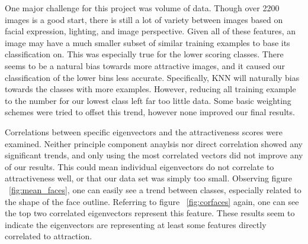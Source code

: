 \documentclass[10pt,twocolumn,letterpaper]{article}
\begin{document}
One major challenge for this project was volume of data. Though over 2200 images is a good start, there is still a lot of variety between images based on facial expression, lighting, and image perspective. Given all of these features, an image may have a much smaller subset of similar training examples to base its classification on. This was especially true for the lower scoring classes. There seems to be a natural bias towards more attractive images, and it caused our classification of the lower bins less accurate. Specifically, KNN will naturally bias towards the classes with more examples. However, reducing all training example to the number for our lowest class left far too little data. Some basic weighting schemes were tried to offset this trend, however none improved our final results.

Correlations between specific eigenvectors and the attractiveness scores were examined. Neither principle component anaylsis nor direct correlation showed any significant trends, and only using the most correlated vectors did not improve any of our results. This could mean individual eigenvectors do not correlate to attractiveness well, or that our data set was simply too small. Observing figure ~\ref{fig:mean_faces}, one can easily see a trend between classes, especially related to the shape of the face outline. Referring to figure ~\ref{fig:corfaces} again, one can see the top two correlated eigenvectors represent this feature. These results seem to indicate the eigenvectors are representing at least some features directly correlated to attraction.
\end{document}
